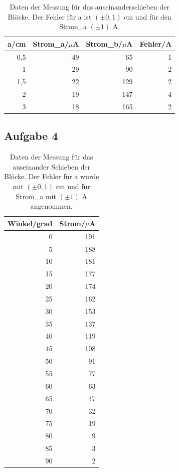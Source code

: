 \documentclass[12pt]{scrartcl}
\begin{document}
\begin{table}[htbp]
\caption{Daten der Messung für das auseinanderschieben der Blöcke. Der Fehler für a ist $(\pm 0,1)$ cm und für den Strom\_a $(\pm 1)$ A.}
\centering
\begin{tabular}{|r|r|r|r|}
\hline
\multicolumn{1}{|l|}{a/cm} & \multicolumn{1}{l|}{Strom\_a/$\mu$A} & \multicolumn{1}{l|}{Strom\_b/$\mu$A} & \multicolumn{1}{l|}{Fehler/A} \\ \hline
0,5 & 49 & 65 & 1 \\ \hline
1 & 29 & 90 & 2 \\ \hline
1,5 & 22 & 129 & 2 \\ \hline
2 & 19 & 147 & 4 \\ \hline
3 & 18 & 165 & 2 \\ \hline
\end{tabular}
\label{tab:a_3_m}
\end{table}

\subsection{Aufgabe 4}

\begin{table}[H]
\caption{Daten der Messung für das auseinander Schieben der Blöcke. Der Fehler für a wurde mit $(\pm 0,1)$ cm und für Strom\_a mit $(\pm 1)$ A angenommen.}
\centering
\begin{tabular}{|r|r|}
\hline
\multicolumn{1}{|l|}{Winkel/grad} & \multicolumn{1}{l|}{Strom/$\mu$A} \\ \hline
0 & 191 \\ \hline
5 & 188 \\ \hline
10 & 181 \\ \hline
15 & 177 \\ \hline
20 & 174 \\ \hline
25 & 162 \\ \hline
30 & 153 \\ \hline
35 & 137 \\ \hline
40 & 119 \\ \hline
45 & 108 \\ \hline
50 & 91 \\ \hline
55 & 77 \\ \hline
60 & 63 \\ \hline
65 & 47 \\ \hline
70 & 32 \\ \hline
75 & 19 \\ \hline
80 & 9 \\ \hline
85 & 3 \\ \hline
90 & 2 \\ \hline
\end{tabular}
\label{tab:a_4}
\end{table}
\end{document}

